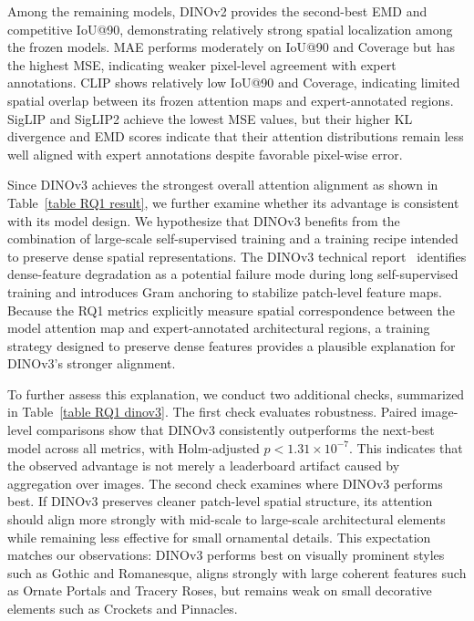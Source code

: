 \documentclass[lineno,pdflatex,sn-mathphys-num]{sn-jnl}%
\theoremstyle{thmstyleone}%
\theoremstyle{thmstyletwo}%
\theoremstyle{thmstylethree}%
\begin{document}
Among the remaining models, DINOv2 provides the second-best EMD and competitive IoU@90, demonstrating relatively strong spatial localization among the frozen models. MAE performs moderately on IoU@90 and Coverage but has the highest MSE, indicating weaker pixel-level agreement with expert annotations. CLIP shows relatively low IoU@90 and Coverage, indicating limited spatial overlap between its frozen attention maps and expert-annotated regions. SigLIP and SigLIP2 achieve the lowest MSE values, but their higher KL divergence and EMD scores indicate that their attention distributions remain less well aligned with expert annotations despite favorable pixel-wise error.

Since DINOv3 achieves the strongest overall attention alignment as shown in Table~\ref{table RQ1 result}, we further examine whether its advantage is consistent with its model design. We hypothesize that DINOv3 benefits from the combination of large-scale self-supervised training and a training recipe intended to preserve dense spatial representations. The DINOv3 technical report~\cite{Simeoni26DINOv3} identifies dense-feature degradation as a potential failure mode during long self-supervised training and introduces Gram anchoring to stabilize patch-level feature maps. Because the RQ1 metrics explicitly measure spatial correspondence between the model attention map and expert-annotated architectural regions, a training strategy designed to preserve dense features provides a plausible explanation for DINOv3's stronger alignment.

To further assess this explanation, we conduct two additional checks, summarized in Table~\ref{table RQ1 dinov3}. The first check evaluates robustness. Paired image-level comparisons show that DINOv3 consistently outperforms the next-best model across all metrics, with Holm-adjusted $p < 1.31 \times 10^{-7}$. This indicates that the observed advantage is not merely a leaderboard artifact caused by aggregation over images. The second check examines where DINOv3 performs best. If DINOv3 preserves cleaner patch-level spatial structure, its attention should align more strongly with mid-scale to large-scale architectural elements while remaining less effective for small ornamental details. This expectation matches our observations: DINOv3 performs best on visually prominent styles such as Gothic and Romanesque, aligns strongly with large coherent features such as Ornate Portals and Tracery Roses, but remains weak on small decorative elements such as Crockets and Pinnacles.
\end{document}
